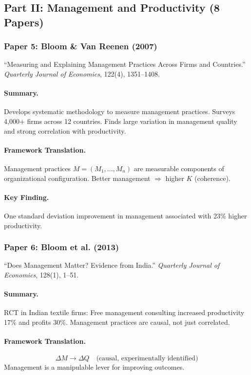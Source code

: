\documentclass[12pt,a4paper]{article}
\begin{document}
\subsection{Part II: Management and Productivity (8 Papers)}

\subsubsection{Paper 5: Bloom \& Van Reenen (2007)}

``Measuring and Explaining Management Practices Across Firms and Countries.''
\textit{Quarterly Journal of Economics}, 122(4), 1351--1408.

\paragraph{Summary.}
Develops systematic methodology to measure management practices. Surveys 4,000+
firms across 12 countries. Finds large variation in management quality and strong
correlation with productivity.

\paragraph{Framework Translation.}
Management practices $M = (M_1, \ldots, M_n)$ are measurable components of organizational
configuration. Better management $\Rightarrow$ higher $K$ (coherence).

\paragraph{Key Finding.}
One standard deviation improvement in management associated with 23\% higher productivity.

\subsubsection{Paper 6: Bloom et al. (2013)}

``Does Management Matter? Evidence from India.''
\textit{Quarterly Journal of Economics}, 128(1), 1--51.

\paragraph{Summary.}
RCT in Indian textile firms: Free management consulting increased productivity 17\%
and profits 30\%. Management practices are causal, not just correlated.

\paragraph{Framework Translation.}
\begin{equation}
  \Delta M \rightarrow \Delta Q \quad \text{(causal, experimentally identified)}
\end{equation}
Management is a manipulable lever for improving outcomes.
\end{document}
